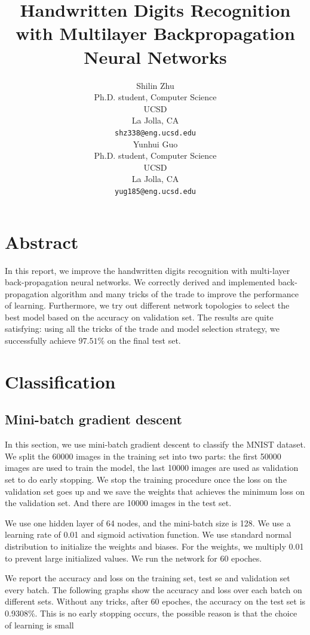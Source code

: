 \documentclass{article} %
\title{Handwritten Digits Recognition with Multilayer Backpropagation Neural Networks}
\author{
Shilin Zhu \\
Ph.D. student, Computer Science\\
UCSD\\
La Jolla, CA \\
\texttt{shz338@eng.ucsd.edu} \\
\And
Yunhui Guo\\
Ph.D. student, Computer Science\\
UCSD\\
La Jolla, CA \\
\texttt{yug185@eng.ucsd.edu} \\
}
\begin{document}
\maketitle
\section{Abstract}
In this report, we improve the handwritten digits recognition with multi-layer back-propagation neural networks. We correctly derived and implemented back-propagation algorithm and many tricks of the trade to improve the performance of learning. Furthermore, we try out different network topologies to select the best model based on the accuracy on validation set. The results are quite satisfying: using all the tricks of the trade and model selection strategy, we successfully achieve $97.51\%$ on the final test set.

\section{Classification}
\subsection{Mini-batch gradient descent}
In this section, we use mini-batch gradient descent to classify the MNIST dataset. We split the 60000 images in the training set into two parts: the first 50000 images are used to train the model, the last 10000 images are used as validation set to do early stopping. We stop the training procedure once the loss on the validation set goes up and we save the weights that achieves the minimum loss on the validation set. And there are 10000 images in the test set.

We use one hidden layer of 64 nodes, and the mini-batch size is 128. We use a learning rate of 0.01 and sigmoid activation function. We use standard normal distribution to initialize the weights and biases. For the weights, we multiply 0.01 to prevent large initialized values. We run the network for 60 epoches.

 We report the accuracy and loss on the training set, test se and validation set every batch. The following graphs show the accuracy and loss over each batch on different sets. Without any tricks, after 60 epoches, the accuracy on the test set is 0.9308\%. This is no early stopping occurs, the possible reason is that the choice of learning is small
\end{document}
